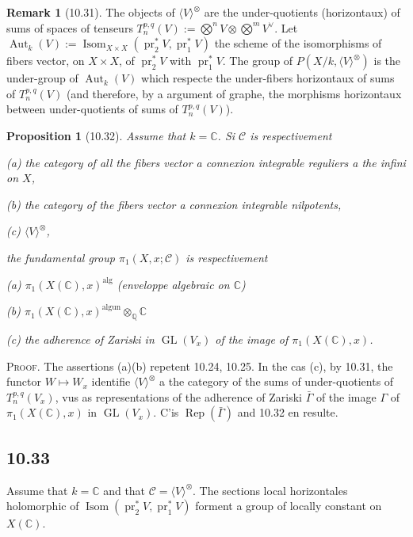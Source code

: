 \documentclass[12pt,a4paper]{article}
\theoremstyle{plain}
\newtheorem{proposition}[theorem]{Proposition}
\theoremstyle{definition}
\newtheorem{remark}[theorem]{Remark}
\theoremstyle{remark}
\DeclareMathOperator{\Isom}{Isom}
\DeclareMathOperator{\Aut}{Aut}
\DeclareMathOperator{\GL}{GL}
\DeclareMathOperator{\pr}{pr}
\DeclareMathOperator{\Rep}{Rep}
\newcommand{\Q}{\mathbb{Q}}
\newcommand{\C}{\mathbb{C}}
\newcommand{\alg}{\mathrm{alg}}
\newcommand{\un}{\mathrm{un}}
\begin{document}
\begin{remark}[10.31]
The objects of $\langle V \rangle^{\otimes}$ are the under-quotients (horizontaux) of sums of spaces of tenseurs $T^{p,q}_n(V) := \bigotimes^n V \otimes \bigotimes^m V^\vee$. Let $\Aut_k(V) := \Isom_{X \times X}(\pr_2^* V, \pr_1^* V)$ the scheme of the isomorphisms of fibers vector, on $X \times X$, of $\pr_2^* V$ with $\pr_1^* V$. The group of $P(X/k, \langle V \rangle^{\otimes})$ is the under-group of $\Aut_k(V)$ which respecte the under-fibers horizontaux of sums of $T^{p,q}_n(V)$ (and therefore, by a argument of graphe, the morphisms horizontaux between under-quotients of sums of $T^{p,q}_n(V)$).
\end{remark}

\begin{proposition}[10.32]
Assume that $k = \C$. Si $\mathcal{C}$ is respectivement

(a) the category of all the fibers vector a connexion integrable reguliers a the infini on $X$,

(b) the category of the fibers vector a connexion integrable nilpotents,

(c) $\langle V \rangle^{\otimes}$,

the fundamental group $\pi_1(X, x; \mathcal{C})$ is respectivement

(a) $\pi_1(X(\C), x)^{\alg}$ (enveloppe algebraic on $\C$)

(b) $\pi_1(X(\C), x)^{\alg \un} \otimes_{\Q} \C$

(c) the adherence of Zariski in $\GL(V_x)$ of the image of $\pi_1(X(\C), x)$.
\end{proposition}

\textsc{Proof.} The assertions (a)(b) repetent 10.24, 10.25. In the cas (c), by 10.31, the functor $W \mapsto W_x$ identifie $\langle V \rangle^{\otimes}$ a the category of the sums of under-quotients of $T^{p,q}_n(V_x)$, vus as representations of the adherence of Zariski $\bar{\Gamma}$ of the image $\Gamma$ of $\pi_1(X(\C), x)$ in $\GL(V_x)$. C'is $\Rep(\bar{\Gamma})$ and 10.32 en resulte.

\subsection*{10.33}

Assume that $k = \C$ and that $\mathcal{C} = \langle V \rangle^{\otimes}$. The sections local horizontales holomorphic of $\Isom(\pr_2^* V, \pr_1^* V)$ forment a group of locally constant on $X(\C)$.
\end{document}
